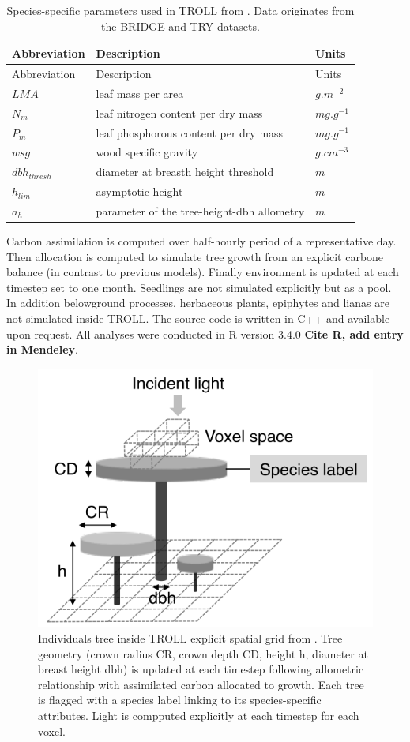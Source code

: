 \documentclass[]{article}
\theoremstyle{definition}
\theoremstyle{definition}
\theoremstyle{remark}
\begin{document}
\begin{longtable}[]{@{}lll@{}}
\caption{\label{tab:traits}Species-specific parameters used in TROLL from
\citet{Li}. Data originates from the BRIDGE \citep{Baraloto2010} and TRY
\citep{Kattge2011} datasets.}\tabularnewline
\toprule
Abbreviation & Description & Units\tabularnewline
\midrule
\endfirsthead
\toprule
Abbreviation & Description & Units\tabularnewline
\midrule
\endhead
\(LMA\) & leaf mass per area & \(g.m^{-2}\)\tabularnewline
\(N_m\) & leaf nitrogen content per dry mass &
\(mg.g^{-1}\)\tabularnewline
\(P_m\) & leaf phosphorous content per dry mass &
\(mg.g^{-1}\)\tabularnewline
\(wsg\) & wood specific gravity & \(g.cm^{-3}\)\tabularnewline
\(dbh_{thresh}\) & diameter at breasth height threshold &
\(m\)\tabularnewline
\(h_{lim}\) & asymptotic height & \(m\)\tabularnewline
\(a_h\) & parameter of the tree-height-dbh allometry &
\(m\)\tabularnewline
\bottomrule
\end{longtable}

Carbon assimilation is computed over half-hourly period of a
representative day. Then allocation is computed to simulate tree growth
from an explicit carbone balance (in contrast to previous models).
Finally environment is updated at each timestep set to one month.
Seedlings are not simulated explicitly but as a pool. In addition
belowground processes, herbaceous plants, epiphytes and lianas are not
simulated inside TROLL. The source code is written in C++ and available
upon request. All analyses were conducted in R version 3.4.0
\textbf{Cite R, add entry in Mendeley}.

\begin{figure}[htbp]
\centering
\includegraphics{images/TROLLtree.png}
\caption{\label{fig:TROLLtree}Individuals tree inside TROLL explicit spatial
grid from \citet{Li}. Tree geometry (crown radius CR, crown depth CD,
height h, diameter at breast height dbh) is updated at each timestep
following allometric relationship with assimilated carbon allocated to
growth. Each tree is flagged with a species label linking to its
species-specific attributes. Light is compputed explicitly at each
timestep for each voxel.}
\end{figure}
\end{document}
